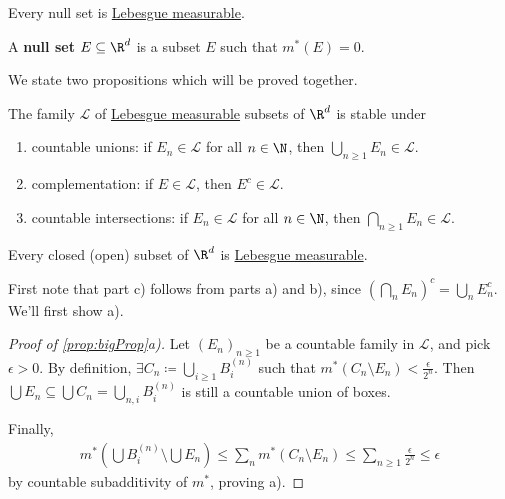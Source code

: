 \documentclass{article}
\newcommand{\1}[1]{\mathbbm{1}_{#1}}
\begin{document}
\begin{remark}
    Every null set is \hyperlink{def:lebMAble}{Lebesgue measurable}.
\end{remark}

\begin{defi}
    A \textbf{null set} $E \subseteq \R^d$ is a subset $E$ such that $m^*(E) = 0$.
\end{defi}

We state two propositions which will be proved together.

\begin{nprop}\label{prop:bigProp}
    The family $\mathcal{L}$ of \hyperlink{def:lebMAble}{Lebesgue measurable} subsets of $\R^d$ is stable under
    \begin{enumerate}[label=\alph*)]
        \item countable unions: if $E_n \in \mathcal{L}$ for all $n \in \N$, then $\bigcup_{n \geq 1} E_n \in \mathcal{L}$.
        \item complementation: if $E \in \mathcal{L}$, then $E^c \in \mathcal{L}$.
        \item countable intersections: if $E_n \in \mathcal{L}$ for all $n \in \N$, then $\bigcap_{n \geq 1} E_n \in \mathcal{L}$.
    \end{enumerate}
\end{nprop}

\begin{nprop}\label{prop:otherBigProp}
    Every closed (open) subset of $\R^d$ is \hyperlink{def:lebMAble}{Lebesgue measurable}.
\end{nprop}

First note that part c) follows from parts a) and b), since $(\bigcap_n E_n)^c = \bigcup_n E_n^c$. We'll first show a).
\begin{proof}[Proof of \cref{prop:bigProp}a)]
    Let $(E_n)_{n \geq 1}$ be a countable family in $\mathcal{L}$, and pick $\epsilon > 0$.  By definition, $\exists C_n \coloneqq \bigcup_{i \geq 1} B_i^{(n)}$ such that $m^*(C_n \setminus E_n) < \frac{\epsilon}{2^n}$.
    Then $\bigcup E_n \subseteq \bigcup C_n = \bigcup_{n, i} B_i^{(n)}$ is still a countable union of boxes.

    Finally,
    \begin{align*}
        m^*\left(\bigcup B_i^{(n)} \setminus \bigcup E_n\right) \leq \sum_n m^*(C_n \setminus E_n) \leq \sum_{n \geq 1} \frac{\epsilon}{2^n} \leq \epsilon
    \end{align*}
    by countable subadditivity of $m^*$, proving a).
\end{proof}
\end{document}
